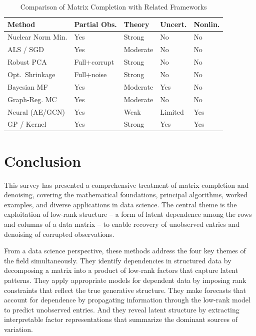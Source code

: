 \documentclass[conference]{IEEEtran}
\begin{document}
\begin{table}[htbp]
  \centering
  \caption{Comparison of Matrix Completion with Related Frameworks}
  \label{tab:method_compare}
  \renewcommand{\arraystretch}{1.3}
  \begin{tabular}{@{}p{2.1cm}p{1.5cm}p{1.5cm}p{1.4cm}p{1.1cm}@{}}
    \toprule
    \textbf{Method} & \textbf{Partial Obs.} & \textbf{Theory} & \textbf{Uncert.} & \textbf{Nonlin.} \\
    \midrule
    Nuclear Norm Min. & Yes & Strong & No & No \\
    ALS / SGD & Yes & Moderate & No & No \\
    Robust PCA & Full+corrupt & Strong & No & No \\
    Opt.\ Shrinkage & Full+noise & Strong & No & No \\
    Bayesian MF & Yes & Moderate & Yes & No \\
    Graph-Reg. MC & Yes & Moderate & No & No \\
    Neural (AE/GCN) & Yes & Weak & Limited & Yes \\
    GP / Kernel & Yes & Strong & Yes & Yes \\
    \bottomrule
  \end{tabular}
\end{table}

\section{Conclusion}
\label{sec:conclusion}

This survey has presented a comprehensive treatment of matrix completion and denoising, covering the mathematical foundations, principal algorithms, worked examples, and diverse applications in data science. The central theme is the exploitation of low-rank structure -- a form of latent dependence among the rows and columns of a data matrix -- to enable recovery of unobserved entries and denoising of corrupted observations.

From a data science perspective, these methods address the four key themes of the field simultaneously. They identify dependencies in structured data by decomposing a matrix into a product of low-rank factors that capture latent patterns. They apply appropriate models for dependent data by imposing rank constraints that reflect the true generative structure. They make forecasts that account for dependence by propagating information through the low-rank model to predict unobserved entries. And they reveal latent structure by extracting interpretable factor representations that summarize the dominant sources of variation.
\end{document}
